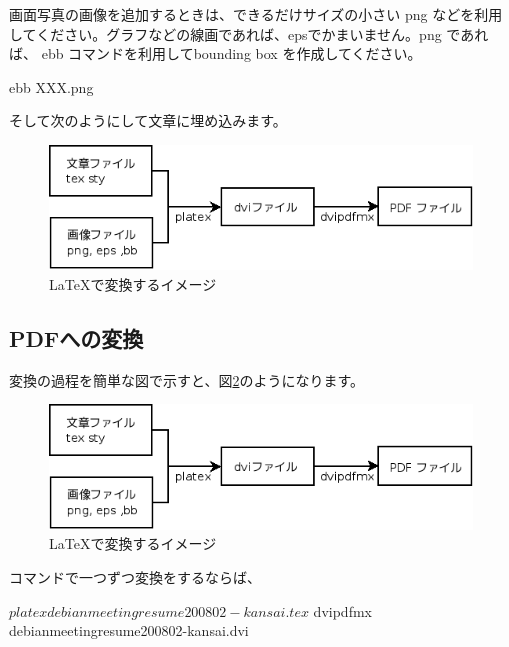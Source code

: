 \documentclass[mingoth,a4paper]{jsarticle}
\begin{document}
画面写真の画像を追加するときは、できるだけサイズの小さい png などを利用
してください。グラフなどの線画であれば、epsでかまいません。png であれば、 
ebb コマンドを利用してbounding box を作成してください。

\begin{commandline}
 ebb XXX.png
\end{commandline}

そして次のようにして文章に埋め込みます。

\begin{commandline}
\begin{figure}[!htbp]
\begin{center}
 \includegraphics[width=120mm]{image200802/latex.png}
 \caption{\LaTeX で変換するイメージ}
 \label{fig:latex}
\end{center}
\end{figure}
\end{commandline}

\subsection{PDFへの変換}

変換の過程を簡単な図で示すと、図\ref{fig:latex}のようになります。

\begin{figure}[!htbp]
\begin{center}
 \includegraphics[width=120mm]{image200802/latex.png}
 \caption{\LaTeX で変換するイメージ}
 \label{fig:latex}
\end{center}
\end{figure}

コマンドで一つずつ変換をするならば、
\begin{commandline}
 $ platex debianmeetingresume200802-kansai.tex
 $ dvipdfmx debianmeetingresume200802-kansai.dvi
\end{commandline}
\end{document}
